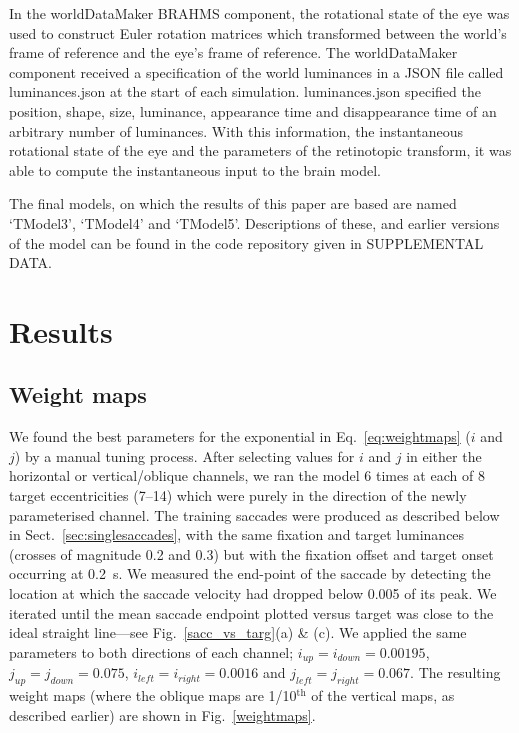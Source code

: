 \documentclass{frontiersSCNS}
\begin{document}
In the worldDataMaker BRAHMS component, the rotational state of the
eye was used to construct Euler rotation matrices which transformed
between the world's frame of reference and the eye's frame of
reference. The worldDataMaker component received a specification of
the world luminances in a JSON file called luminances.json at the
start of each simulation. luminances.json specified the position,
shape, size, luminance, appearance time and disappearance time of an
arbitrary number of luminances. With this information, the
instantaneous rotational state of the eye and the parameters of the
retinotopic transform, it was able to compute the instantaneous input
to the brain model.

The final models, on which the results of this paper are based are
named `TModel3', `TModel4' and `TModel5'. Descriptions of these, and
earlier versions of the model can be found in the code repository
given in SUPPLEMENTAL DATA.


\section{Results}

\subsection{Weight maps}

We found the best parameters for the exponential in
Eq.~\ref{eq:weightmaps} ($i$ and $j$) by a manual tuning
process. After selecting values for $i$ and $j$ in either the
horizontal or vertical/oblique channels, we ran the model 6 times at
each of 8 target eccentricities (7\dg--14\dg) which were purely in the
direction of the newly parameterised channel. The training saccades
were produced as described below in Sect.~\ref{sec:singlesaccades},
with the same fixation and target luminances (crosses of magnitude 0.2
and 0.3) but with the fixation offset and target onset occurring at
0.2~s. We measured the end-point of the saccade by detecting the
location at which the saccade velocity had dropped below 0.005 of its
peak. We iterated until the mean saccade endpoint plotted versus
target was close to the ideal straight line---see
Fig.~\ref{sacc_vs_targ}(a) \& (c). We applied the same parameters to
both directions of each channel; $i_{up} = i_{down} = 0.00195$,
$j_{up} = j_{down} = 0.075$, $i_{left} = i_{right} = 0.0016$ and
$j_{left} = j_{right} = 0.067$. The resulting weight maps (where the
oblique maps are 1/10$^{\mathrm{th}}$ of the vertical maps, as
described earlier) are shown in Fig.~\ref{weightmaps}.
\end{document}
